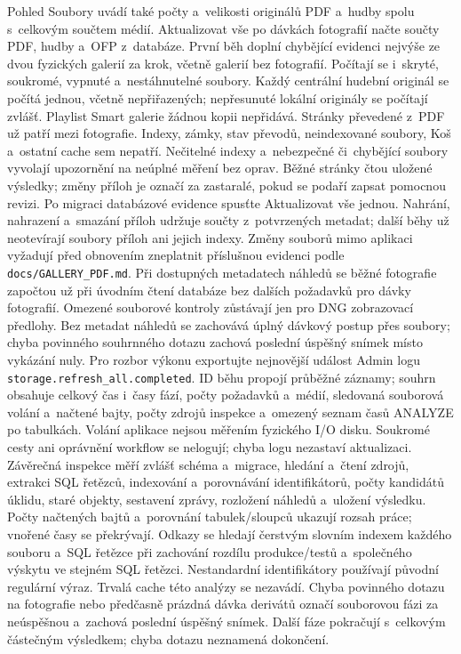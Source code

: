 \documentclass[11pt,a4paper]{article}
\newcommand{\codeword}[1]{\nolinkurl{#1}}
\begin{document}
Pohled Soubory uvádí také počty a~velikosti originálů PDF a~hudby
spolu s~celkovým součtem médií. Aktualizovat vše po dávkách fotografií
načte součty PDF, hudby a~OFP z~databáze. První běh doplní chybějící evidenci
nejvýše ze dvou fyzických galerií za krok, včetně galerií bez fotografií.
Počítají se i~skryté, soukromé, vypnuté a~nestáhnutelné soubory. Každý
centrální hudební originál se počítá jednou, včetně nepřiřazených;
nepřesunuté lokální originály se počítají zvlášť. Playlist Smart galerie
žádnou kopii nepřidává. Stránky převedené z~PDF už patří mezi fotografie.
Indexy, zámky,
stav převodů, neindexované soubory, Koš a~ostatní cache sem nepatří.
Nečitelné indexy a~nebezpečné či~chybějící soubory vyvolají upozornění
na neúplné měření bez oprav. Běžné stránky čtou uložené výsledky; změny
příloh je označí za zastaralé, pokud se podaří zapsat pomocnou revizi.
Po migraci databázové evidence spusťte Aktualizovat vše jednou. Nahrání,
nahrazení a~smazání příloh udržuje součty z~potvrzených metadat; další běhy
už neotevírají soubory příloh ani jejich indexy. Změny souborů mimo aplikaci
vyžadují před obnovením zneplatnit příslušnou evidenci podle
\codeword{docs/GALLERY\_PDF.md}.
Při dostupných metadatech náhledů se běžné fotografie započtou už při úvodním
čtení databáze bez dalších požadavků pro dávky fotografií. Omezené souborové
kontroly zůstávají jen pro DNG zobrazovací předlohy. Bez metadat náhledů se
zachovává úplný dávkový postup přes soubory; chyba povinného souhrnného dotazu
zachová poslední úspěšný snímek místo vykázání nuly.
Pro rozbor výkonu exportujte nejnovější událost Admin logu
\codeword{storage.refresh\_all.completed}. ID běhu propojí průběžné záznamy;
souhrn obsahuje celkový čas i~časy fází, počty požadavků a~médií, sledovaná
souborová volání a~načtené bajty, počty zdrojů inspekce a~omezený seznam časů
ANALYZE po tabulkách. Volání aplikace nejsou měřením fyzického I/O disku.
Soukromé cesty ani oprávnění workflow se nelogují; chyba logu nezastaví
aktualizaci.
Závěrečná inspekce měří zvlášť schéma a~migrace, hledání a~čtení zdrojů,
extrakci SQL řetězců, indexování a~porovnávání identifikátorů, počty kandidátů
úklidu, staré objekty, sestavení zprávy, rozložení náhledů a~uložení výsledku.
Počty načtených bajtů a~porovnání tabulek/sloupců ukazují rozsah práce;
vnořené časy se překrývají. Odkazy se hledají čerstvým slovním indexem každého
souboru a~SQL řetězce při zachování rozdílu produkce/testů a~společného výskytu
ve stejném SQL řetězci. Nestandardní identifikátory používají původní regulární
výraz. Trvalá cache této analýzy se nezavádí.
Chyba povinného dotazu na fotografie nebo předčasně prázdná dávka derivátů
označí souborovou fázi za neúspěšnou a~zachová poslední úspěšný snímek.
Další fáze pokračují s~celkovým částečným výsledkem; chyba dotazu neznamená
dokončení.
\end{document}
